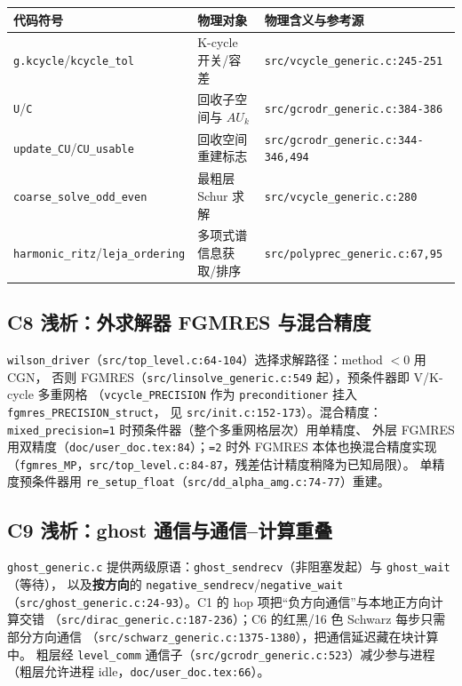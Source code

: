 \documentclass[UTF8]{ctexart}
\begin{document}
\begin{xltabular}{\textwidth}{llX}
\toprule
\textcolor{map}{代码符号} & 物理对象 & 物理含义与参考源 \\
\midrule
\endhead
\texttt{g.kcycle}/\texttt{kcycle\_tol} & K-cycle 开关/容差 & \texttt{\nolinkurl{src/vcycle_generic.c:245-251}} \\
\texttt{U}/\texttt{C} & 回收子空间与 $AU_k$ & \texttt{\nolinkurl{src/gcrodr_generic.c:384-386}} \\
\texttt{update\_CU}/\texttt{CU\_usable} & 回收空间重建标志 & \texttt{\nolinkurl{src/gcrodr_generic.c:344-346,494}} \\
\texttt{coarse\_solve\_odd\_even} & 最粗层 Schur 求解 & \texttt{\nolinkurl{src/vcycle_generic.c:280}} \\
\texttt{harmonic\_ritz}/\texttt{leja\_ordering} & 多项式谱信息获取/排序 & \texttt{\nolinkurl{src/polyprec_generic.c:67,95}} \\
\bottomrule
\end{xltabular}

\subsection{C8 浅析：外求解器 FGMRES 与混合精度}
\texttt{wilson\_driver}（\texttt{\nolinkurl{src/top_level.c:64-104}}）选择求解路径：method $<0$ 用 CGN，
否则 FGMRES（\texttt{\nolinkurl{src/linsolve_generic.c:549}} 起），预条件器即 V/K-cycle 多重网格
（\texttt{vcycle\_PRECISION} 作为 \texttt{preconditioner} 挂入 \texttt{fgmres\_PRECISION\_struct}，
见 \texttt{\nolinkurl{src/init.c:152-173}}）。混合精度：\texttt{mixed\_precision=1} 时预条件器（整个多重网格层次）用单精度、
外层 FGMRES 用双精度（\texttt{\nolinkurl{doc/user_doc.tex:84}}）；\texttt{=2} 时外 FGMRES 本体也换混合精度实现
（\texttt{fgmres\_MP}，\texttt{\nolinkurl{src/top_level.c:84-87}}，残差估计精度稍降为已知局限）。
单精度预条件器用 \texttt{re\_setup\_float}（\texttt{\nolinkurl{src/dd_alpha_amg.c:74-77}}）重建。

\subsection{C9 浅析：ghost 通信与通信--计算重叠}
\texttt{ghost\_generic.c} 提供两级原语：\texttt{ghost\_sendrecv}（非阻塞发起）与 \texttt{ghost\_wait}（等待），
以及\textbf{按方向}的 \texttt{negative\_sendrecv}/\texttt{negative\_wait}
（\texttt{\nolinkurl{src/ghost_generic.c:24-93}}）。C1 的 hop 项把``负方向通信''与本地正方向计算交错
（\texttt{\nolinkurl{src/dirac_generic.c:187-236}}）；C6 的红黑/16 色 Schwarz 每步只需部分方向通信
（\texttt{\nolinkurl{src/schwarz_generic.c:1375-1380}}），把通信延迟藏在块计算中。
粗层经 \texttt{level\_comm} 通信子（\texttt{\nolinkurl{src/gcrodr_generic.c:523}}）减少参与进程
（粗层允许进程 idle，\texttt{\nolinkurl{doc/user_doc.tex:66}}）。
\end{document}
